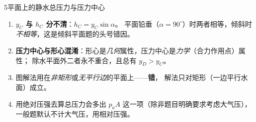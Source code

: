 \begin{kaodian}{5}{平面上的静水总压力与压力中心}
\begin{yicuo}
\begin{enumerate}
\item \textbf{$y_C$ 与 $h_C$ 分不清}：$h_C=y_C\sin\alpha$。
  平面铅垂（$\alpha=90^\circ$）时两者相等，倾斜时\emph{不相等}，这是倾斜平面题的头号错因。\\
\item \textbf{压力中心与形心混淆}：形心是\emph{几何}属性，压力中心是\emph{力学}（合力作用点）属性；
  除水平面外二者永不重合，且总有 $y_D>y_C$。\\
\item 图解法用在\emph{非矩形}或\emph{无平行边}的平面上——\textbf{错}，
  解法只对矩形（一边平行水面）成立。\\
\item 用绝对压强去算总压力会多出 $p_a A$ 这一项（除非题目明确要求考虑大气压），
  一般题默认不计大气压，用相对压强。
\end{enumerate}
\end{yicuo}
\end{kaodian}

